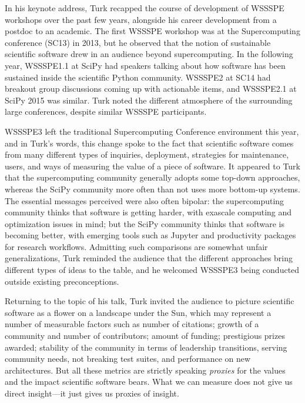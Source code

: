 \documentclass[11pt, oneside]{amsart}
\begin{document}
In his keynote address, Turk recapped the course of development of WSSSPE
workshops over the past few years, alongside his career development from a
postdoc to an academic. The first WSSSPE workshop was at the Supercomputing
conference (SC13) in 2013, but he observed that the notion of sustainable
scientific software drew in an audience beyond supercomputing. In the following
year, WSSSPE1.1 at SciPy had speakers talking about how software has been
sustained inside the scientific Python community. WSSSPE2 at SC14 had breakout
group discussions coming up with actionable items, and WSSSPE2.1 at SciPy 2015
was similar. Turk noted the different atmosphere of the surrounding large
conferences, despite similar WSSSPE participants.

WSSSPE3 left the traditional Supercomputing Conference environment this year,
and in Turk's words, this change spoke to the fact that scientific software
comes from many different types of inquiries, deployment, strategies for
maintenance, users, and ways of measuring the value of a piece of software. It
appeared to Turk that the supercomputing community generally adopts some
top-down approaches, whereas the SciPy community more often than not uses more
bottom-up systems. The essential messages perceived were also often bipolar: the
supercomputing community thinks that software is getting harder, with exascale
computing and optimization issues in mind; but the SciPy community thinks that
software is becoming better, with emerging tools such as Jupyter and
productivity packages for research workflows. Admitting such comparisons are
somewhat unfair generalizations, Turk reminded the audience that the different
approaches bring different types of ideas to the table, and he welcomed WSSSPE3
being conducted outside existing preconceptions.

Returning to the topic of his talk, Turk invited the audience to picture
scientific software as a flower on a landscape under the Sun, which may
represent a number of measurable factors such as number of citations; growth of
a community and number of contributors; amount of funding; prestigious prizes
awarded; stability of the community in terms of leadership transitions, serving
community needs, not breaking test suites, and performance on new architectures.
But all these metrics are strictly speaking \emph{proxies} for the values and
the impact scientific software bears. What we can measure does not give us
direct insight---it just gives us proxies of insight.
  
\end{document}
